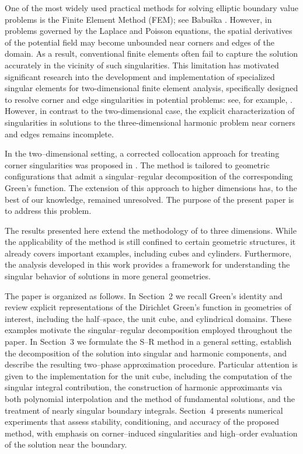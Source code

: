\documentclass[12pt,oneside,reqno]{amsart}%
\theoremstyle{plain}
\numberwithin{equation}{section}
\begin{document}
One of the most widely used practical methods for solving elliptic boundary value problems is the Finite Element Method (FEM); see Babuška \cite{Babuska}. However, in problems governed by the Laplace and Poisson equations, the spatial derivatives of the potential field may become unbounded near corners and edges of the domain. As a result, conventional finite elements often fail to capture the solution accurately in the vicinity of such singularities. This limitation has motivated significant research into the development and implementation of specialized singular elements for two-dimensional finite element analysis, specifically designed to resolve corner and edge singularities in potential problems: see, for example, \cite{Cost, Gris, Kozlov, Mukh, Ong}. However, in contrast to the two-dimensional case, the explicit characterization of singularities in solutions to the three-dimensional harmonic problem near corners and edges remains incomplete.

In the two--dimensional setting, a corrected collocation approach
for treating corner singularities was proposed in \cite{Levin1980}.
The method is tailored to geometric configurations
that admit a singular--regular decomposition of the corresponding Green's function.
The extension of this approach to higher dimensions has,
to the best of our knowledge, remained unresolved.
The purpose of the present paper is to address this problem.

The results presented here extend the methodology of \cite{Levin1980}
to three dimensions.
While the applicability of the method is still confined to certain
geometric structures, it already covers important examples,
including cubes and cylinders.
Furthermore, the analysis developed in this work
provides a framework for understanding the singular behavior
of solutions in more general geometries.

The paper is organized as follows. 
In Section~2 we recall Green’s identity and review explicit 
representations of the Dirichlet Green’s function in geometries 
of interest, including the half–space, the unit cube, 
and cylindrical domains. These examples motivate the 
singular–regular decomposition employed throughout the paper. 
In Section~3 we formulate the S–R method in a general setting, 
establish the decomposition of the solution into singular 
and harmonic components, and describe the resulting two–phase 
approximation procedure. Particular attention is given to the 
implementation for the unit cube, including the computation 
of the singular integral contribution, the construction of 
harmonic approximants via both polynomial interpolation and 
the method of fundamental solutions, and the treatment of 
nearly singular boundary integrals. 
Section~4 presents numerical experiments that assess stability, 
conditioning, and accuracy of the proposed method, with 
emphasis on corner–induced singularities and high–order 
evaluation of the solution near the boundary.
\end{document}
